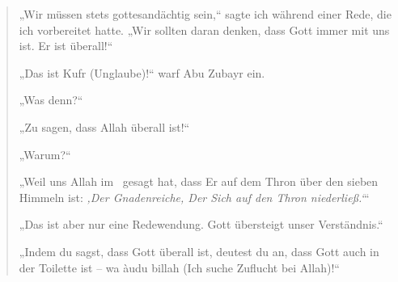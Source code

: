 \documentclass[12pt]{memoir}
\begin{document}
\begin{quote}
„Wir müssen stets gottesandächtig sein,“
sagte ich während einer Rede, die ich vorbereitet hatte.
„Wir sollten daran denken, dass Gott immer mit uns ist.
Er ist überall!“

„Das ist Kufr (Unglaube)!“ warf Abu Zubayr ein.

„Was denn?“

„Zu sagen, dass Allah überall ist!“

„Warum?“

„Weil uns Allah im \Quran\ gesagt hat,
dass Er auf dem Thron über den sieben Himmeln ist:
\emph{‚Der Gnadenreiche, Der Sich auf den Thron niederließ.‘}“

„Das ist aber nur eine Redewendung.
Gott übersteigt unser Verständnis.“

„Indem du sagst, dass Gott überall ist, deutest du an,
dass Gott auch in der Toilette ist –
wa \`audu billah (Ich suche Zuflucht bei Allah)!“
\end{quote}
\end{document}
